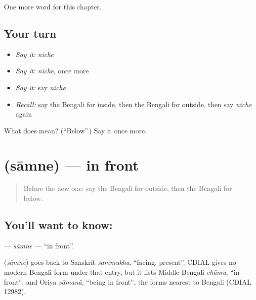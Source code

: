 \begin{grammarlens}[title={What you've built}]
One more word for this chapter.
\end{grammarlens}

\subsection*{Your turn}
\begin{itemize}
\raggedright
  \item \emph{Say it:} \emph{niche}
  \item \emph{Say it:} \emph{niche}, once more
  \item \emph{Say it:} say \emph{niche}
  \item \emph{Recall:} say the Bengali for inside, then the Bengali for outside, then say \emph{niche} again
\end{itemize}

\begin{tcolorbox}[breakable,colback=teal!4,colframe=teal!35!black,title={Before you move on}]
What does  mean? (\textquotedblleft{}Below\textquotedblright{}.) Say it once more.
\end{tcolorbox}
\section[\texorpdfstring{\bn{সামনে} (sāmne)}{সামনে (sāmne)}]{ (sāmne) — in front}

\label{lesson:BN-C81-samne}



\begin{quote}
Before the new one: say the Bengali for outside, then the Bengali for below.
\end{quote}

\subsection*{You'll want to know: }
\textbf{} — \emph{sāmne} — \textquotedblleft{}in front\textquotedblright{}.

\begin{cousinweb}
\textbf{} (\emph{sāmne}) goes back to Sanskrit \emph{saṁmukha}, \textquotedblleft{}facing, present\textquotedblright{}. CDIAL gives no modern Bengali form under that entry, but it lists Middle Bengali \emph{chāmu}, \textquotedblleft{}in front\textquotedblright{}, and Oriya \emph{sāmanā}, \textquotedblleft{}being in front\textquotedblright{}, the forms nearest to Bengali (CDIAL 12982).
\end{cousinweb}


